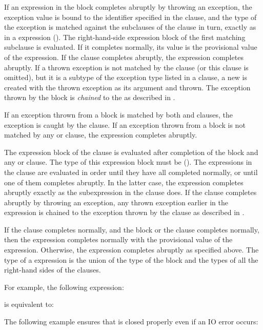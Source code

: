 If an expression in the  block completes abruptly by throwing
an exception, the exception value is bound to the identifier specified in
the  clause, and the type of the exception is matched
against the subclauses of the  clause in turn, exactly as in a
 expression ().
The right-hand-side expression block
of the first matching subclause is evaluated.  If it
completes normally, its value is the provisional value of the
 expression.  If the  clause completes abruptly,
the  expression completes abruptly.  If a thrown exception is
not matched by the  clause (or this clause is omitted), but
it is a subtype of the exception type listed in a
 clause, a new
 is created with the thrown exception as its
argument and thrown.
The exception thrown by the  block is \emph{chained} to the
 as described in
.


If an exception thrown from a  block is matched by both
 and  clauses, the exception is caught by the
 clause.
If an exception thrown from a  block is not matched by any
 or  clause, the  expression completes
abruptly.


The expression block of the  clause
is evaluated after completion of the  block
and any  or  clause.
The type of this expression block must be ().
The expressions in the  clause are evaluated in order until
they have all completed normally, or until one of them completes abruptly.
In the latter case, the  expression completes abruptly exactly as
the subexpression in the  clause does.
If the  clause completes abruptly by throwing an exception,
any thrown exception earlier in the  expression is chained to the
exception thrown by the  clause as described in
.


If the  clause completes normally,
and the  block or the 
clause completes normally, then the  expression completes
normally with the provisional value of the  expression.
Otherwise, the  expression completes abruptly as specified above.
The type of a  expression is the union
of the type of the  block
and the types of all the right-hand sides of the  clauses.

For example, the following  expression:

is equivalent to:

The following example ensures that  is closed properly even if an
IO error occurs:

